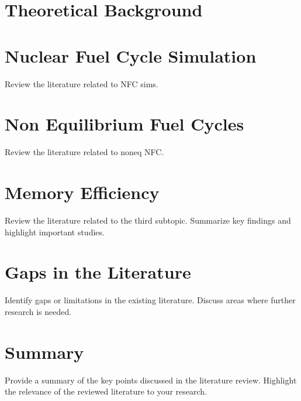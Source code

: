 
\section{Theoretical Background}

\section{Nuclear Fuel Cycle Simulation}
Review the literature related to NFC sims.

\section{Non Equilibrium Fuel Cycles}
Review the literature related to noneq NFC.

\section{Memory Efficiency}
Review the literature related to the third subtopic. Summarize key findings and highlight important studies.

\section{Gaps in the Literature}
Identify gaps or limitations in the existing literature. Discuss areas where further research is needed.

\section{Summary}
Provide a summary of the key points discussed in the literature review. Highlight the relevance of the reviewed literature to your research.
